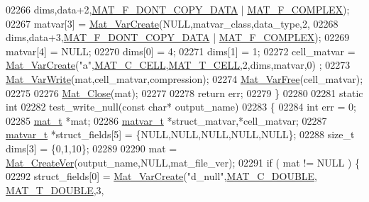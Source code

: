 \begin{DoxyCode}
{{{{{02266                    dims,data+2,\hyperlink{group___m_a_t_ggab9d6ef9e3ddca78a317b173f01d53fbba762244499f52eb35e7b53fb79a1f2889}{MAT\_F\_DONT\_COPY\_DATA} | 
      \hyperlink{group___m_a_t_ggab9d6ef9e3ddca78a317b173f01d53fbbacd7b091a11184aad7fc6078c04470780}{MAT\_F\_COMPLEX});
02267     matvar[3] = \hyperlink{group___m_a_t_ga1c54a84bb4d810c6fccdb8869489eac4}{Mat\_VarCreate}(NULL,matvar\_class,data\_type,2,
02268                    dims,data+3,\hyperlink{group___m_a_t_ggab9d6ef9e3ddca78a317b173f01d53fbba762244499f52eb35e7b53fb79a1f2889}{MAT\_F\_DONT\_COPY\_DATA} | 
      \hyperlink{group___m_a_t_ggab9d6ef9e3ddca78a317b173f01d53fbbacd7b091a11184aad7fc6078c04470780}{MAT\_F\_COMPLEX});
02269     matvar[4] = NULL;
02270     dims[0] = 4;
02271     dims[1] = 1;
02272     cell\_matvar = \hyperlink{group___m_a_t_ga1c54a84bb4d810c6fccdb8869489eac4}{Mat\_VarCreate}(\textcolor{stringliteral}{"a"},\hyperlink{group___m_a_t_ggad4d60ae7b709fc81bfd744fb4c857c40a2f7abb47a1c51e248bd4e5e03cc81b08}{MAT\_C\_CELL},\hyperlink{group___m_a_t_ggacf7b3b879282b7ab3a51190e49bf3453a07599cf2cca6d2b2d059378563318ba5}{MAT\_T\_CELL},2,dims,matvar,0)
      ;
02273     \hyperlink{group___m_a_t_ga4bd3eba12df415d8226e27c457fbbb0b}{Mat\_VarWrite}(mat,cell\_matvar,compression);
02274     \hyperlink{group___m_a_t_ga1d14716f7450530fd1c9d02413787f0e}{Mat\_VarFree}(cell\_matvar);
02275 
02276     \hyperlink{group___m_a_t_ga101c92ff7bde4a2d4615661beba09262}{Mat\_Close}(mat);
02277 
02278     \textcolor{keywordflow}{return} err;
02279 \}
02280 
02281 \textcolor{keyword}{static} \textcolor{keywordtype}{int}
02282 test\_write\_null(\textcolor{keyword}{const} \textcolor{keywordtype}{char}* output\_name)
02283 \{
02284     \textcolor{keywordtype}{int}       err = 0;
02285     \hyperlink{struct__mat__t}{mat\_t}    *mat;
02286     \hyperlink{group___m_a_t_structmatvar__t}{matvar\_t} *struct\_matvar,*cell\_matvar;
02287     \hyperlink{group___m_a_t_structmatvar__t}{matvar\_t} *struct\_fields[5] = \{NULL,NULL,NULL,NULL,NULL\};
02288     \textcolor{keywordtype}{size\_t}    dims[3] = \{0,1,10\};
02289 
02290     mat = \hyperlink{group___m_a_t_ga22d404f203af7869c841400e7ad247cf}{Mat\_CreateVer}(output\_name,NULL,mat\_file\_ver);
02291     \textcolor{keywordflow}{if} ( mat != NULL ) \{
02292         struct\_fields[0] = \hyperlink{group___m_a_t_ga1c54a84bb4d810c6fccdb8869489eac4}{Mat\_VarCreate}(\textcolor{stringliteral}{"d\_null"},\hyperlink{group___m_a_t_ggad4d60ae7b709fc81bfd744fb4c857c40a5d70e0862e5bdb7bd86bf7ba5948f307}{MAT\_C\_DOUBLE},
      \hyperlink{group___m_a_t_ggacf7b3b879282b7ab3a51190e49bf3453a31e721ecf7e188196f83c32838288797}{MAT\_T\_DOUBLE},3,
}}}}}
\end{DoxyCode}
